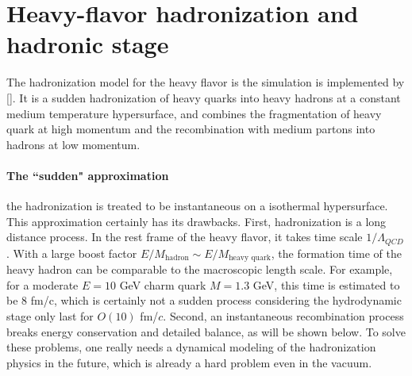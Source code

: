 \section{Heavy-flavor hadronization and hadronic stage}
The hadronization model for the heavy flavor is the simulation is implemented by [].
It is a sudden hadronization of heavy quarks into heavy hadrons at a constant medium temperature hypersurface, and combines the fragmentation of heavy quark at high momentum and the recombination with medium partons into hadrons at low momentum.

\paragraph{The ``sudden" approximation} the hadronization is treated to be instantaneous on a isothermal hypersurface.
This approximation certainly has its drawbacks.
First, hadronization is a long distance process. 
In the rest frame of the heavy flavor, it takes time scale $1/\Lambda_{QCD}$. 
With a large boost factor $E/M_{\textrm{hadron}}\sim E/M_{\textrm{heavy quark}}$, the formation time of the heavy hadron can be comparable to the macroscopic length scale.
For example, for a moderate $E=10$ GeV charm quark $M=1.3$ GeV, this time is estimated to be $8$ fm/c, which is certainly not a sudden process considering the hydrodynamic stage only last for $O(10)$ fm/$c$.
Second, an instantaneous recombination process breaks energy conservation and detailed balance, as will be shown below.
To solve these problems, one really needs a dynamical modeling of the hadronization physics in the future,
which is already a hard problem even in the vacuum.



